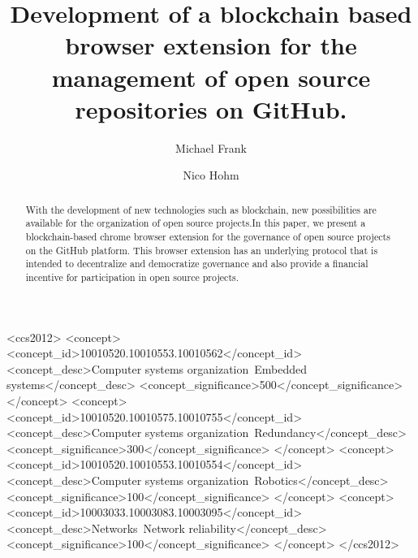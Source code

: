 \documentclass[sigconf]{acmart}
\begin{document}
\title{Development of a blockchain based browser extension for the management of open source repositories on GitHub.}

\author{Michael Frank}

\author{Nico Hohm}

\begin{abstract}
With the development of new technologies such as blockchain, new possibilities are available for the organization of open source projects.In this paper, we present a blockchain-based chrome browser extension for the governance of open source projects on the GitHub platform. This browser extension has an underlying protocol that is intended to decentralize and democratize governance and also provide a financial incentive for participation in open source projects.
\end{abstract}

\begin{CCSXML}
<ccs2012>
 <concept>
  <concept_id>10010520.10010553.10010562</concept_id>
  <concept_desc>Computer systems organization~Embedded systems</concept_desc>
  <concept_significance>500</concept_significance>
 </concept>
 <concept>
  <concept_id>10010520.10010575.10010755</concept_id>
  <concept_desc>Computer systems organization~Redundancy</concept_desc>
  <concept_significance>300</concept_significance>
 </concept>
 <concept>
  <concept_id>10010520.10010553.10010554</concept_id>
  <concept_desc>Computer systems organization~Robotics</concept_desc>
  <concept_significance>100</concept_significance>
 </concept>
 <concept>
  <concept_id>10003033.10003083.10003095</concept_id>
  <concept_desc>Networks~Network reliability</concept_desc>
  <concept_significance>100</concept_significance>
 </concept>
</ccs2012>
\end{CCSXML}

\end{document}
